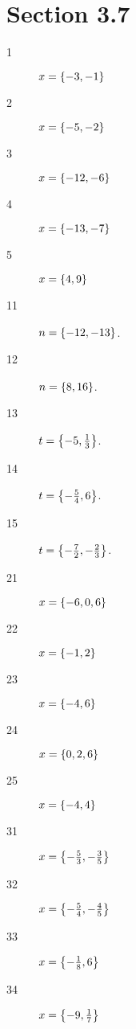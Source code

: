 \documentclass[letterpaper, landscape]{exam}
\begin{document}
  \ifprintanswers{}
    \section{Section 3.7} %
    
    \begin{description}
      \item[1] $x = \cbr{ -3, -1 }$

      \item[2] $x = \cbr{ -5, -2 }$

      \item[3] $x = \cbr{ -12, -6 }$

      \item[4] $x = \cbr{ -13, -7 }$

      \item[5] $x = \cbr{ 4, 9 }$

      \item[11] $n = \cbr{ -12, -13 }$.

      \item[12] $n = \cbr{ 8, 16 }$.

      \item[13] $t = \cbr{ -5, \frac{1}{3} }$.

      \item[14] $t = \cbr{ - \frac{5}{4}, 6 }$.

      \item[15] $t = \cbr{ - \frac{7}{2}, - \frac{2}{3} }$.

      \item[21] $x = \cbr{ -6, 0, 6 }$

      \item[22] $x = \cbr{ -1, 2 }$

      \item[23] $x = \cbr{ -4, 6 }$

      \item[24] $x = \cbr{ 0, 2, 6 }$

      \item[25] $x = \cbr{ -4, 4 }$

      \item[31] $x = \cbr{ - \frac{5}{3}, - \frac{3}{5} }$

      \item[32] $x = \cbr{ - \frac{5}{4}, - \frac{4}{5} }$

      \item[33] $x = \cbr{ - \frac{1}{8}, 6 }$

      \item[34] $x = \cbr{ - 9, \frac{1}{7} }$


\end{description}
\end{document}
